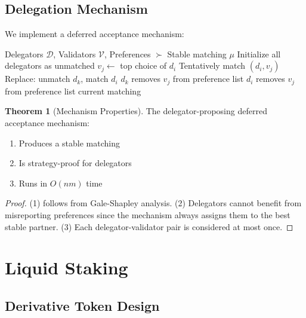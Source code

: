 \documentclass[11pt,a4paper]{article}
\theoremstyle{definition}
\newtheorem{theorem}{Theorem}[section]
\theoremstyle{remark}
\begin{document}
\subsection{Delegation Mechanism}

We implement a deferred acceptance mechanism:

\begin{algorithm}
\caption{Delegator-Proposing Deferred Acceptance}
\begin{algorithmic}[1]
\Require Delegators $\mathcal{D}$, Validators $\mathcal{V}$, Preferences $\succ$
\Ensure Stable matching $\mu$
\State Initialize all delegators as unmatched
    \State $v_j \gets$ top choice of $d_i$
        \State Tentatively match $(d_i, v_j)$
        \State Replace: unmatch $d_k$, match $d_i$
        \State $d_k$ removes $v_j$ from preference list
    \Else
        \State $d_i$ removes $v_j$ from preference list
    \EndIf
\EndWhile
\State \Return current matching
\end{algorithmic}
\end{algorithm}

\begin{theorem}[Mechanism Properties]
The delegator-proposing deferred acceptance mechanism:
\begin{enumerate}
    \item Produces a stable matching
    \item Is strategy-proof for delegators
    \item Runs in $O(nm)$ time
\end{enumerate}
\end{theorem}

\begin{proof}
(1) follows from Gale-Shapley analysis. (2) Delegators cannot benefit from misreporting preferences since the mechanism always assigns them to the best stable partner. (3) Each delegator-validator pair is considered at most once.
\end{proof}

\section{Liquid Staking}

\subsection{Derivative Token Design}
\end{document}
